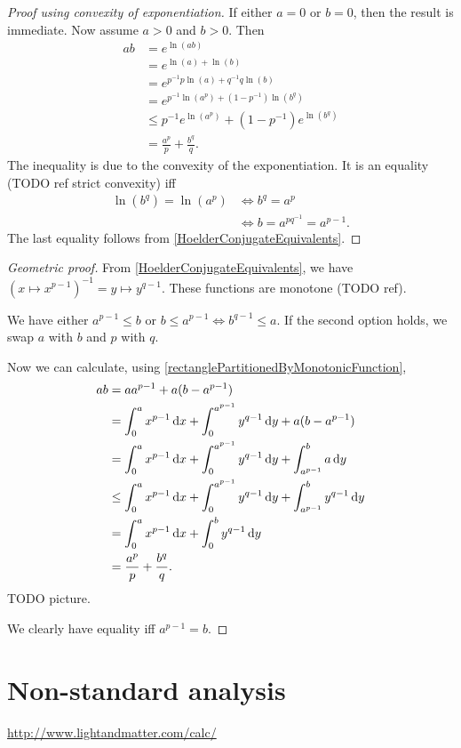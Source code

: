 \begin{proof}[Proof using convexity of exponentiation]
If either $a=0$ or $b =0$, then the result is immediate. Now assume $a>0$ and $b>0$. Then
\begin{align*}
ab &= e^{\ln(ab)} \\
&= e^{\ln(a)+\ln(b)} \\
&= e^{p^{-1}p\ln(a)+q^{-1}q\ln(b)} \\
&= e^{p^{-1}\ln(a^p)+(1-p^{-1})\ln(b^q)} \\
&\leq p^{-1}e^{\ln(a^p)}+(1-p^{-1})e^{\ln(b^q)} \\
&= \frac{a^p}{p} + \frac{b^q}{q}.
\end{align*}
The inequality is due to the convexity of the exponentiation. It is an equality (TODO ref strict convexity) iff
\begin{align*}
\ln(b^q) = \ln(a^p) &\iff b^q = a^p \\
&\iff b = a^{pq^{-1}} = a^{p-1}.
\end{align*}
The last equality follows from \ref{HoelderConjugateEquivalents}.
\end{proof}
\begin{proof}[Geometric proof]
From \ref{HoelderConjugateEquivalents}, we have $(x\mapsto x^{p-1})^{-1} = y\mapsto y^{q-1}$. These functions are monotone (TODO ref).

We have either $a^{p-1}\leq b$ or $b\leq a^{p-1} \iff b^{q-1} \leq a$. If the second option holds, we swap $a$ with $b$ and $p$ with $q$.

Now we can calculate, using \ref{rectanglePartitionedByMonotonicFunction},
\begin{align*}
ab &= aa^{p-1} + a(b-a^{p-1}) \\
&= \int_0^a x^{p-1}\diff{x} + \int_0^{a^{p-1}} y^{q-1}\diff{y} + a(b-a^{p-1}) \\
&= \int_0^a x^{p-1}\diff{x} + \int_0^{a^{p-1}} y^{q-1}\diff{y} + \int_{a^{p-1}}^b a\diff{y} \\
&\leq \int_0^a x^{p-1}\diff{x} + \int_0^{a^{p-1}} y^{q-1}\diff{y} + \int_{a^{p-1}}^b y^{q-1}\diff{y} \\
&= \int_0^a x^{p-1}\diff{x} + \int_0^{b} y^{q-1}\diff{y} \\
&= \frac{a^p}{p} + \frac{b^q}{q}.
\end{align*}
TODO picture.

We clearly have equality iff $a^{p-1} = b$.
\end{proof}

\section{Non-standard analysis}
\url{http://www.lightandmatter.com/calc/}

